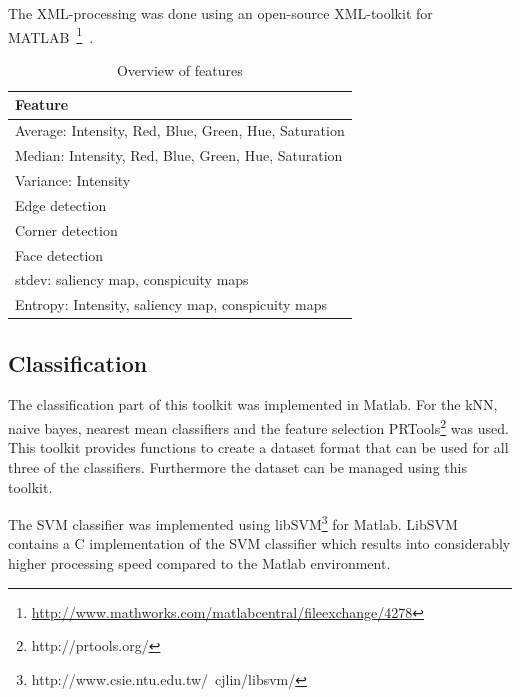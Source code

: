 The XML-processing was done using an open-source XML-toolkit for MATLAB~\footnote{\url{http://www.mathworks.com/matlabcentral/fileexchange/4278}}~\cite{geusebroek2005six}.

\begin{table}[htb]
    \centering
    \begin{tabular}	{ | l | } 
		\hline
		Feature \\
		\hline
		Average: Intensity, Red, Blue, Green, Hue, Saturation \\
		\hline
		Median: Intensity, Red, Blue, Green, Hue, Saturation \\
		\hline
		Variance: Intensity \\
		\hline
		Edge detection \\
		\hline 
		Corner detection \\
		\hline
		Face detection \\
		\hline
		stdev: saliency map, conspicuity maps \\
		\hline
		Entropy: Intensity, saliency map, conspicuity maps \\
		\hline
\hline
    \end{tabular}
    \caption{Overview of features}
    \label{tab:featurelist}
\end{table}

\subsection{Classification}
The classification part of this toolkit was implemented in Matlab.
For the kNN, naive bayes, nearest mean classifiers and the feature selection PRTools\footnote{http://prtools.org/} \cite{Duin00prtoolsversion} was used.
This toolkit provides functions to create a dataset format that can be used for all three of the classifiers.
Furthermore the dataset can be managed using this toolkit.

The SVM classifier was implemented using libSVM\footnote{http://www.csie.ntu.edu.tw/~cjlin/libsvm/} \cite{chang2001libsvm} for Matlab.
LibSVM contains a C implementation of the SVM classifier which results into considerably higher processing speed compared to the Matlab environment.

